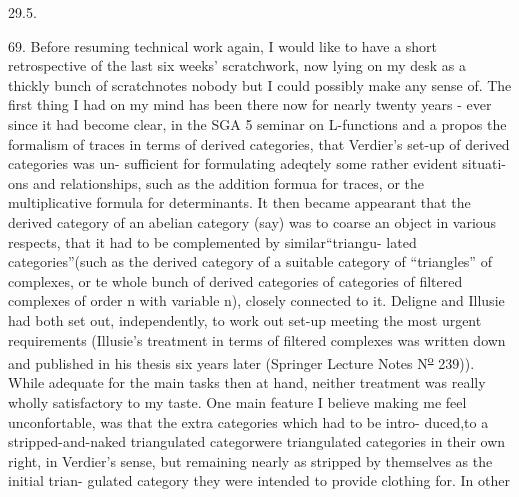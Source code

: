
29.5.

69. Before resuming   technical work again, I would like to have a
short retrospective of the last six weeks' scratchwork, now lying on my
desk as a thickly bunch of scratchnotes\hand{,} nobody but I could possibly make
any sense of. \hand{//}The first thing I had on my mind has been there now for
nearly twenty years - ever since it had become clear, in the SGA 5
seminar on L-functions and a propos the formalism of traces in terms of
derived categories, that Verdier's set-up of derived categories was un-%
sufficient for formulating adeqtely  some rather evident situati-%
ons\xout{,} and relationships, such as the addition formua for traces, or the
multiplicative formula for determinants. It then became appearant that
the derived category of an abelian category (say) was to coarse an object
in various respects, that it had to be complemented by similar``triangu-%
lated categories''(such as the  derived category of a suitable category
of ``triangles'' of complexes, or te whole bunch of derived categories
of categories of filtered complexes of order n with variable n), closely
connected to it. Deligne and Illusie had both set out, independently,
to work out  set-up meeting the most urgent requirements (Illusie's
treatment in terms of filtered complexes was written down and published
in his thesis six years later (Springer Lecture Notes N\textsuperscript{\underline{o}} 239)). While
adequate for the main tasks then at hand, neither treatment was really
wholly satisfactory to my taste. One main feature I believe making me
feel unconfortable, was that the extra categories which had to be intro-%
duced,to   a stripped-and-naked triangulated categor\hand{,}were
triangulated categories in their own right, in Verdier's sense, but
remaining nearly as stripped  by themselves as the initial trian-%
gulated category they were intended to provide clothing for. In other
